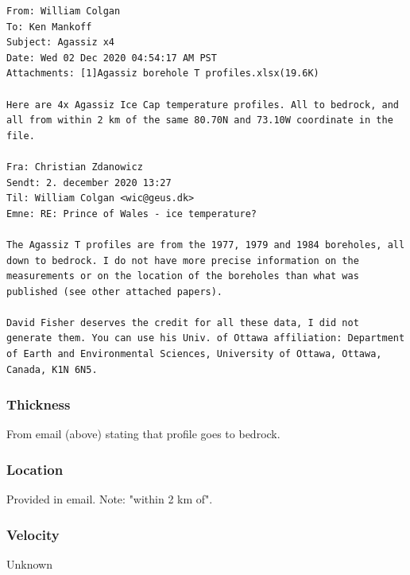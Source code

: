 \documentclass[article,a4paper,times,11pt,twoside]{article}
\begin{document}
\begin{verbatim}
From: William Colgan
To: Ken Mankoff
Subject: Agassiz x4
Date: Wed 02 Dec 2020 04:54:17 AM PST
Attachments: [1]Agassiz borehole T profiles.xlsx(19.6K)

Here are 4x Agassiz Ice Cap temperature profiles. All to bedrock, and
all from within 2 km of the same 80.70N and 73.10W coordinate in the
file.

Fra: Christian Zdanowicz
Sendt: 2. december 2020 13:27
Til: William Colgan <wic@geus.dk>
Emne: RE: Prince of Wales - ice temperature?

The Agassiz T profiles are from the 1977, 1979 and 1984 boreholes, all
down to bedrock. I do not have more precise information on the
measurements or on the location of the boreholes than what was
published (see other attached papers).

David Fisher deserves the credit for all these data, I did not
generate them. You can use his Univ. of Ottawa affiliation: Department
of Earth and Environmental Sciences, University of Ottawa, Ottawa,
Canada, K1N 6N5.
\end{verbatim}

\subsubsection{Thickness}
\label{sec:org78d23e7}

From email (above) stating that profile goes to bedrock.

\subsubsection{Location}
\label{sec:org609731a}

Provided in email. Note: "within 2 km of".

\subsubsection{Velocity}
\label{sec:org3e40b3f}

Unknown
\clearpage
\end{document}
